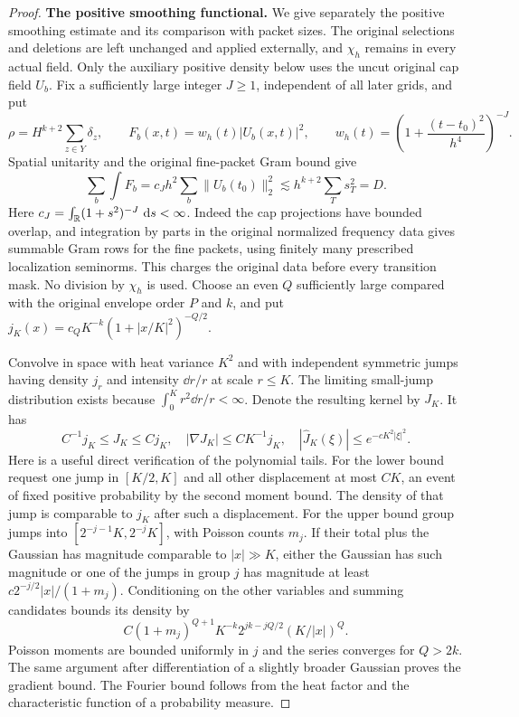 \begin{proof}
\textbf{The positive smoothing functional.}
We give separately the positive smoothing estimate and its comparison
with packet sizes. The original selections and deletions are left
unchanged and applied externally, and $\chi_h$ remains in every actual
field. Only the auxiliary positive density below uses the uncut
original cap field $U_b$. Fix a sufficiently large integer $J\ge1$,
independent of all later grids, and put
\[
 \rho=H^{k+2}\sum_{z\in Y}\delta_z,\qquad
 F_b(x,t)=w_h(t)|U_b(x,t)|^2,\qquad
 w_h(t)=\left(1+\frac{(t-t_0)^2}{h^4}\right)^{-J}.
\]
Spatial unitarity and the original fine-packet Gram bound give
\begin{equation}\label{f:auxiliary-energy}
 \sum_b\int F_b
 =c_Jh^2\sum_b\|U_b(t_0)\|_2^2
 \lesssim h^{k+2}\sum_Ts_T^2=D.
\end{equation}
Here $c_J=\int_{\mathbb R}(1+s^2)^{-J}\,\,\mathrm d s<\infty$.
Indeed the cap projections have bounded overlap, and integration by
parts in the original normalized frequency data gives summable Gram
rows for the fine packets, using finitely many prescribed localization
seminorms. This charges the original data before every transition
mask. No division by $\chi_h$ is used. Choose an even
$Q$ sufficiently large compared with the original envelope order $P$ and
$k$, and put $j_K(x)=c_QK^{-k}(1+|x/K|^2)^{-Q/2}$.

Convolve in space with heat variance $K^2$ and with independent
symmetric jumps having density $j_r$ and intensity $\dd r/r$ at scale
$r\le K$. The limiting small-jump distribution exists because
$\int_0^K r^2\dd r/r<\infty$. Denote the resulting kernel by $J_K$.
It has
\begin{equation}\label{f:kernel}
 C^{-1}j_K\le J_K\le Cj_K,\quad
 |\nabla J_K|\le CK^{-1}j_K,\quad
 |\widehat J_K(\xi)|\le e^{-cK^2|\xi|^2}.
\end{equation}
Here is a useful direct verification of the polynomial tails. For the
lower bound request one jump in $[K/2,K]$ and all other displacement
at most $CK$, an event of fixed positive probability by the second
moment bound. The density of that jump is comparable to $j_K$ after
such a displacement. For the upper bound group jumps into
$[2^{-j-1}K,2^{-j}K]$, with Poisson counts $m_j$. If their total plus
the Gaussian has magnitude comparable to $|x|\gg K$, either the
Gaussian has such magnitude or one of the jumps in group $j$ has
magnitude at least $c2^{-j/2}|x|/(1+m_j)$. Conditioning on the other
variables and summing candidates bounds its density by
\[
 C(1+m_j)^{Q+1}K^{-k}2^{jk-jQ/2}(K/|x|)^Q.
\]
Poisson moments are bounded uniformly in $j$ and the series converges
for $Q>2k$. The same argument after differentiation of a slightly
broader Gaussian proves the gradient bound. The Fourier bound follows
from the heat factor and the characteristic function of a probability
measure.


\end{proof}
